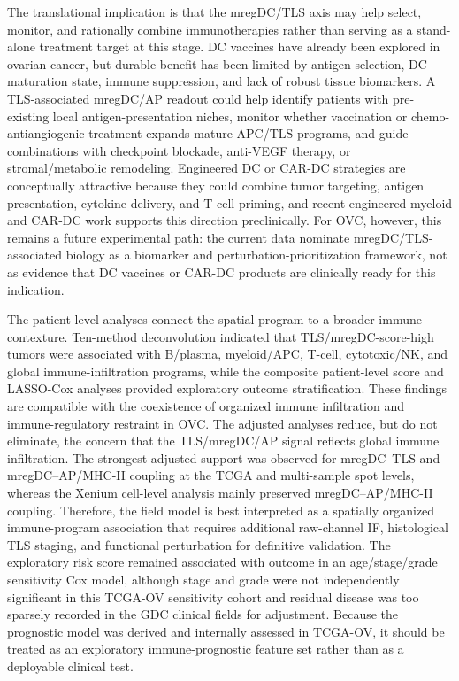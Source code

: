 \documentclass[cancers,article,submit,pdftex,moreauthors]{Definitions/mdpi}
\begin{document}
The translational implication is that the mregDC/TLS axis may help select, monitor, and rationally combine immunotherapies rather than serving as a stand-alone treatment target at this stage. DC vaccines have already been explored in ovarian cancer, but durable benefit has been limited by antigen selection, DC maturation state, immune suppression, and lack of robust tissue biomarkers\cite{bib69}. A TLS-associated mregDC/AP readout could help identify patients with pre-existing local antigen-presentation niches, monitor whether vaccination or chemo-antiangiogenic treatment expands mature APC/TLS programs, and guide combinations with checkpoint blockade, anti-VEGF therapy, or stromal/metabolic remodeling. Engineered DC or CAR-DC strategies are conceptually attractive because they could combine tumor targeting, antigen presentation, cytokine delivery, and T-cell priming, and recent engineered-myeloid and CAR-DC work supports this direction preclinically\cite{bib103,bib124}. For OVC, however, this remains a future experimental path: the current data nominate mregDC/TLS-associated biology as a biomarker and perturbation-prioritization framework, not as evidence that DC vaccines or CAR-DC products are clinically ready for this indication.

The patient-level analyses connect the spatial program to a broader immune contexture. Ten-method deconvolution indicated that TLS/mregDC-score-high tumors were associated with B/plasma, myeloid/APC, T-cell, cytotoxic/NK, and global immune-infiltration programs, while the composite patient-level score and LASSO-Cox analyses provided exploratory outcome stratification. These findings are compatible with the coexistence of organized immune infiltration and immune-regulatory restraint in OVC\cite{bib90,bib91,bib94,bib95,bib103,bib105,bib106,bib107,bib108}. The adjusted analyses reduce, but do not eliminate, the concern that the TLS/mregDC/AP signal reflects global immune infiltration. The strongest adjusted support was observed for mregDC--TLS and mregDC--AP/MHC-II coupling at the TCGA and multi-sample spot levels, whereas the Xenium cell-level analysis mainly preserved mregDC--AP/MHC-II coupling. Therefore, the field model is best interpreted as a spatially organized immune-program association that requires additional raw-channel IF, histological TLS staging, and functional perturbation for definitive validation. The exploratory risk score remained associated with outcome in an age/stage/grade sensitivity Cox model, although stage and grade were not independently significant in this TCGA-OV sensitivity cohort and residual disease was too sparsely recorded in the GDC clinical fields for adjustment. Because the prognostic model was derived and internally assessed in TCGA-OV, it should be treated as an exploratory immune-prognostic feature set rather than as a deployable clinical test.
\end{document}

